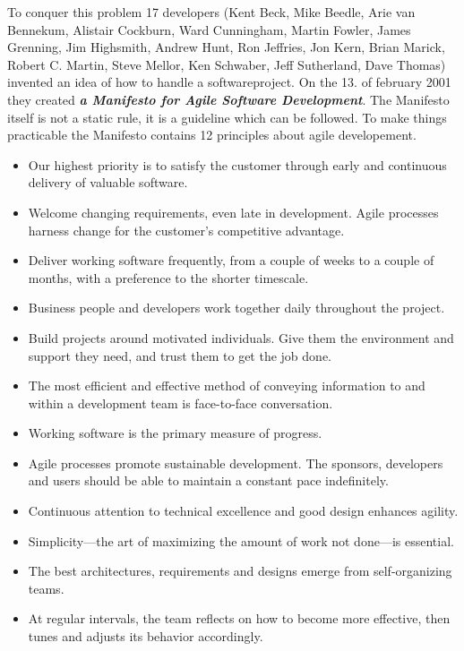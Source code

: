 To conquer this problem 17 developers (Kent Beck, Mike Beedle, Arie van Bennekum, Alistair Cockburn, Ward Cunningham, Martin Fowler, James Grenning,
Jim Highsmith, Andrew Hunt, Ron Jeffries, Jon Kern, Brian Marick, Robert C. Martin, Steve Mellor, Ken Schwaber, Jeff Sutherland, Dave Thomas)
invented an idea of how to handle a softwareproject. On the 13. of february 2001 they created \textbf{\textit{a Manifesto for Agile Software Development}}.
The Manifesto itself is not a static rule, it is a guideline which can be followed. To make things practicable the Manifesto contains 12 principles about
agile developement.

\begin{itemize}
  \item Our highest priority is to satisfy the customer through early and continuous delivery of valuable software.
  \item Welcome changing requirements, even late in development. Agile processes harness change for the customer's competitive advantage.
  \item Deliver working software frequently, from a couple of weeks to a couple of months, with a preference to the shorter timescale.
  \item Business people and developers work together daily throughout the project.
  \item Build projects around motivated individuals. Give them the environment and support they need, and trust them to get the job done.
  \item The most efficient and effective method of conveying information to and within a development team is face-to-face conversation.
  \item Working software is the primary measure of progress.
  \item Agile processes promote sustainable development. The sponsors, developers and users should be able to maintain a constant pace indefinitely.
  \item Continuous attention to technical excellence and good design enhances agility.
  \item Simplicity—the art of maximizing the amount of work not done—is essential.
  \item The best architectures, requirements and designs emerge from self-organizing teams.
  \item At regular intervals, the team reflects on how to become more effective, then tunes and adjusts its behavior accordingly.
\end{itemize} \cite{fowler2001agile}

